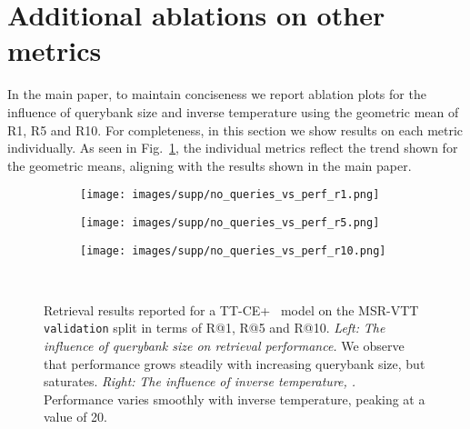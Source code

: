 \section{Additional ablations on other metrics}
\label{sec:other-metrics}
In the main paper,
to maintain conciseness we report ablation plots for the influence of querybank size
and inverse temperature  using the geometric mean of R1, R5 and R10.
For completeness, in this section we show results on each metric individually.
As seen in Fig.~\ref{fig:num-queries-and-hyperparam-r1},
the individual metrics reflect the trend shown for the geometric means,
aligning with the results shown in the main paper.

\begin{figure}
    \centering
    \begin{subfigure}[b]{0.5\textwidth}
        \texttt{[image: images/supp/no\_queries\_vs\_perf\_r1.png]}
    \end{subfigure}
    \begin{subfigure}[b]{0.5\textwidth}
        \texttt{[image: images/supp/no\_queries\_vs\_perf\_r5.png]}
    \end{subfigure}
    \begin{subfigure}[b]{0.5\textwidth}
        \texttt{[image: images/supp/no\_queries\_vs\_perf\_r10.png]}
    \end{subfigure}
    \vspace{-0.3cm}
    \caption{Retrieval results reported for a TT-CE+~\cite{croitoru2021teachtext} model on the MSR-VTT~\cite{xu2016msr} \texttt{validation} split in terms of R@1, R@5 and R@10.
    \textit{Left:} \textit{The influence of querybank size on retrieval performance.}
    We observe that performance grows steadily with increasing querybank size, but saturates.
    \textit{Right:} \textit{The influence of inverse temperature, .} Performance varies smoothly with inverse temperature, peaking at a value of 20.}
    \mbox{}\vspace{-0.7cm} \\
    \label{fig:num-queries-and-hyperparam-r1}
\end{figure}

